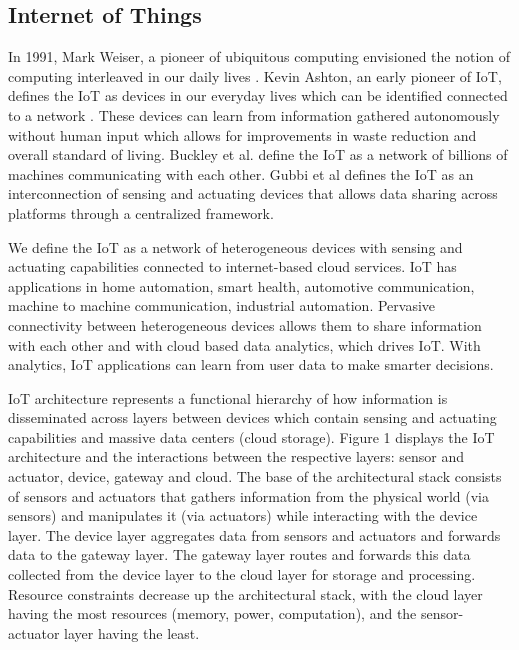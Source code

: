 \documentclass[conference]{IEEEtran}
\begin{document}
\subsection{Internet of Things}

In 1991, Mark Weiser, a pioneer of ubiquitous computing envisioned the notion of computing interleaved in our daily lives \cite{weiser1991}. Kevin Ashton, an early pioneer of IoT, defines the IoT as devices in our everyday lives which can be identified connected to a network \cite{ashton2009internet}. These devices can learn from information gathered autonomously without human input which allows for improvements in waste reduction and overall standard of living. Buckley et al. \cite{yan2008internet} define the IoT as a network of billions of machines communicating with each other. Gubbi et al \cite{gubbi_internet_2013} defines the IoT as an interconnection of sensing and actuating
devices that allows data sharing across platforms through a centralized framework. 

\par We define the IoT as a network of heterogeneous devices with sensing and actuating capabilities connected to internet-based cloud services. IoT has applications in home automation, smart health, automotive communication, machine to machine communication, industrial automation. Pervasive connectivity between heterogeneous devices allows them to share information with each other and with cloud based data analytics, which drives IoT. With analytics, IoT applications can learn from user data
to make smarter decisions. 



\par  IoT architecture represents a functional hierarchy of how information is disseminated across layers between devices which contain sensing and
actuating capabilities and massive data centers (cloud storage). Figure 1 displays the IoT architecture and the interactions between the respective
layers: sensor and actuator, device, gateway and cloud. The base of the architectural stack consists of sensors and actuators that gathers information from the physical world (via sensors) and manipulates it (via actuators) while interacting with the device layer. The device layer aggregates data from sensors and actuators and forwards data to the gateway layer. The gateway layer routes and forwards this data collected from the
device layer to the cloud layer for storage and processing. Resource constraints decrease up the architectural stack, with
the cloud layer having the most resources (memory, power, computation), and the sensor-actuator layer having the least. 
\end{document}
